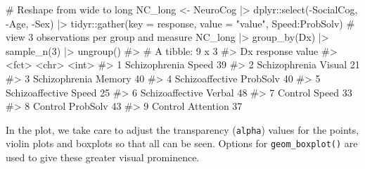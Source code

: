 \documentclass[
  letterpaper,
  10pt,
  krantz2]{krantz}
\makeatletter
\newenvironment{Shaded}{\begin{snugshade}}{\end{snugshade}}
\newcommand{\AttributeTok}[1]{\textcolor[rgb]{0.40,0.45,0.13}{#1}}
\newcommand{\CommentTok}[1]{\textcolor[rgb]{0.37,0.37,0.37}{#1}}
\newcommand{\DecValTok}[1]{\textcolor[rgb]{0.68,0.00,0.00}{#1}}
\newcommand{\FunctionTok}[1]{\textcolor[rgb]{0.28,0.35,0.67}{#1}}
\newcommand{\NormalTok}[1]{\textcolor[rgb]{0.00,0.23,0.31}{#1}}
\newcommand{\OtherTok}[1]{\textcolor[rgb]{0.00,0.23,0.31}{#1}}
\newcommand{\SpecialCharTok}[1]{\textcolor[rgb]{0.37,0.37,0.37}{#1}}
\newcommand{\StringTok}[1]{\textcolor[rgb]{0.13,0.47,0.30}{#1}}
\newenvironment{kframe}{%
  \medskip{}
  \setlength{\fboxsep}{.8em}
  \def\at@end@of@kframe{}%
  \ifinner\ifhmode%
  \def\at@end@of@kframe{\end{minipage}}%
  \begin{minipage}{\columnwidth}%
  \fi\fi%
  \def\FrameCommand##1{\hskip\@totalleftmargin \hskip-\fboxsep
  \colorbox{shadecolor}{##1}\hskip-\fboxsep
      \hskip-\linewidth \hskip-\@totalleftmargin \hskip\columnwidth}%
  \MakeFramed {\advance\hsize-\width
    \@totalleftmargin\z@ \linewidth\hsize
    \@setminipage}}%
{\par\unskip\endMakeFramed%
  \at@end@of@kframe}
\renewenvironment{Shaded}{\begin{kframe}}{\end{kframe}}
\makeatother
\begin{document}
\begin{Shaded}
\begin{Highlighting}[]
\CommentTok{\# Reshape from wide to long}
\NormalTok{NC\_long }\OtherTok{\textless{}{-}}\NormalTok{ NeuroCog }\SpecialCharTok{|\textgreater{}}
\NormalTok{  dplyr}\SpecialCharTok{::}\FunctionTok{select}\NormalTok{(}\SpecialCharTok{{-}}\NormalTok{SocialCog, }\SpecialCharTok{{-}}\NormalTok{Age, }\SpecialCharTok{{-}}\NormalTok{Sex) }\SpecialCharTok{|\textgreater{}}
\NormalTok{  tidyr}\SpecialCharTok{::}\FunctionTok{gather}\NormalTok{(}\AttributeTok{key =}\NormalTok{ response, }\AttributeTok{value =} \StringTok{"value"}\NormalTok{, Speed}\SpecialCharTok{:}\NormalTok{ProbSolv)}
\CommentTok{\# view 3 observations per group and measure}
\NormalTok{NC\_long }\SpecialCharTok{|\textgreater{}}
  \FunctionTok{group\_by}\NormalTok{(Dx) }\SpecialCharTok{|\textgreater{}}
  \FunctionTok{sample\_n}\NormalTok{(}\DecValTok{3}\NormalTok{) }\SpecialCharTok{|\textgreater{}} \FunctionTok{ungroup}\NormalTok{()}
\CommentTok{\#\textgreater{} \# A tibble: 9 x 3}
\CommentTok{\#\textgreater{}   Dx              response  value}
\CommentTok{\#\textgreater{}   \textless{}fct\textgreater{}           \textless{}chr\textgreater{}     \textless{}int\textgreater{}}
\CommentTok{\#\textgreater{} 1 Schizophrenia   Speed        39}
\CommentTok{\#\textgreater{} 2 Schizophrenia   Visual       21}
\CommentTok{\#\textgreater{} 3 Schizophrenia   Memory       40}
\CommentTok{\#\textgreater{} 4 Schizoaffective ProbSolv     40}
\CommentTok{\#\textgreater{} 5 Schizoaffective Speed        25}
\CommentTok{\#\textgreater{} 6 Schizoaffective Verbal       48}
\CommentTok{\#\textgreater{} 7 Control         Speed        33}
\CommentTok{\#\textgreater{} 8 Control         ProbSolv     43}
\CommentTok{\#\textgreater{} 9 Control         Attention    37}
\end{Highlighting}
\end{Shaded}

In the plot, we take care to adjust the transparency (\texttt{alpha})
values for the points, violin plots and boxplots so that all can be
seen. Options for \texttt{geom\_boxplot()} are used to give these
greater visual prominence.
\end{document}
